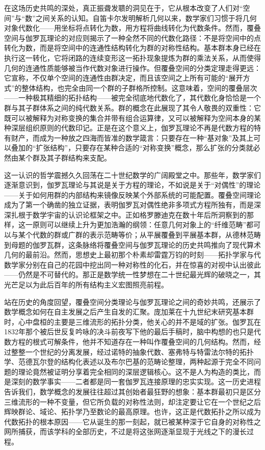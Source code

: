 \documentclass[12pt,a4paper]{article}
\begin{document}
在这场历史共鸣的深处，真正振聋发聩的洞见在于，它从根本改变了人们对“空间”与“数”之间关系的认知。自笛卡尔发明解析几何以来，数学家们习惯于将几何对象代数化——用坐标将点转化为数，用方程将曲线转化为代数条件。然而，覆叠空间与伽罗瓦理论的对应则揭示了一种全然不同的代数化路径：不是将空间中的点转化为数，而是将空间中的连通性结构转化为群的对称性结构。基本群本身已经在执行这一转化，它将闭路的连续变形这一拓扑现象提炼为群的乘法关系，从而使得几何的连通性质能够被当作代数对象进行操作。但覆叠空间的分类定理走得更远：它宣称，不仅单个空间的连通性由群决定，而且该空间之上所有可能的“展开方式”的整体结构，也完全由同一个群的子群格所控制。这意味着，空间的覆叠层次——一种极其精细的拓扑结构——被完全彻底地代数化了，其代数化身恰恰是一个群与其子群体系之间的纯代数关系。群的概念在此展现了其令人敬畏的双重性：它既可以被解释为对称变换的集合并带有组合运算律，又可以被解释为空间本身的某种深层组织原则的代数印记。正是在这个意义上，伽罗瓦理论不再是代数方程的特有财产，而成为一种放之四海而皆准的数学箴言：只要存在一种“基对象”及其上可以叠加的“扩张结构”，只要存在某种合适的“对称变换”概念，那么扩张的分类就必然由某个群及其子群结构来支配。

这一认识的哲学震撼久久回荡在二十世纪数学的广阔殿堂之中。那些年，数学家们逐渐意识到，伽罗瓦理论与其说是关于方程的理论，不如说是关于“对偶性”的理论——关于如何用群的内部结构来镜像反映某个外部系统的可能配置。覆叠空间理论成为了第一个确凿的独立证据，表明伽罗瓦对偶性绝非多项式方程所独有，而是深深扎根于数学宇宙的认识论框架之中。正如格罗滕迪克在数十年后所洞察到的那样，这一原则可以继续上升为更加浩瀚的纲领：任意几何对象上的“纤维范畴”都可以与某个代数的群或广群的表示范畴等价；从平展覆叠到平展基本群，从德林范畴到母题的伽罗瓦群，这条脉络将覆叠空间与伽罗瓦理论的历史共鸣推向了现代算术几何的最前沿。然而，思想史上最初那个朴素却雷霆万钧的时刻——拓扑学家与代数学家分别在自己的花园中挖出同一种对称性的化石，并在惊喜的对视中认出彼此——仍然是不可替代的。那正是数学统一性梦想在二十世纪最光辉的破晓之一，其光芒足以为此后百年的所有结构主义宏图照亮前程。

站在历史的角度回望，覆叠空间分类理论与伽罗瓦理论之间的奇妙共鸣，还展示了数学概念如何在自主发展之后产生自发的汇聚。庞加莱在十九世纪末研究基本群时，心中盘桓的主要是三维流形的拓扑分类，他关心的并不是域的扩张。伽罗瓦在1832年那个被后世反复吟咏的决斗前夜写下他的最后手稿时，脑中构想的也只是代数方程的根式可解条件，他并不知道存在一种叫作覆叠空间的几何结构。然而，经过整整一个世纪的分离发展，经过诺特的抽象代数、塞弗特与特雷法尔特的拓扑学、范德瓦尔登的结构化表述以及布尔巴基的范畴论整理，两种起源于完全不同问题的理论竟然被证明分享着完全相同的深层逻辑核心。这不是人为构造的类比，而是深刻的数学事实——二者都是同一套伽罗瓦连接原理的忠实实现。这一历史进程告诉我们，数学概念的发展往往超过其创始者最狂野的想象：基本群最初只是区分三维流形的一种不变量，但它所负载的对称性法则，却注定要让它在一个世纪之后辉映群论、域论、拓扑学乃至数论的最高原理。也许，这正是代数拓扑之所以成为代数拓扑的根本原因——它从诞生的那一刻起，就已被某种深于它自身的对称性之网所捕获，而该学科的全部历史，不过是将这张网逐渐显现于光线之下的漫长过程。
\end{document}

